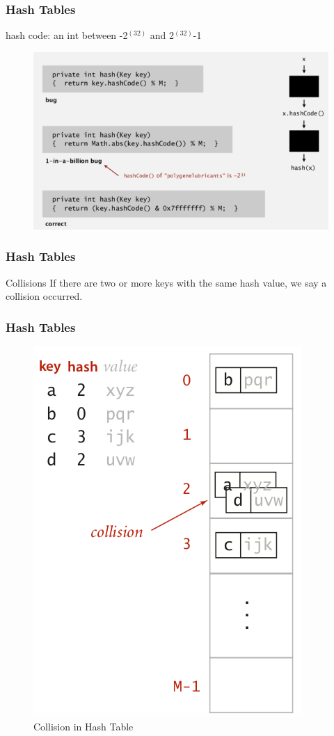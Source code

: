 \documentclass[11pt]{beamer}
\begin{document}
      \begin{frame}
     	\frametitle{Hash Tables}
     	\alert{hash code: } an int between -2$^(32)$ and 2$^(32)$-1
     	\begin{figure}
     		\centering
     		\includegraphics[width=1\linewidth]{"Screenshot 2020-11-29 at 10.40.20 PM"}
     		\label{fig:screenshot-2020-11-29-at-10}
     	\end{figure}
     	
     \end{frame}

     	\begin{frame}
     	\frametitle{Hash Tables}
     	\begin{block}{Collisions}
     		If there are two or more keys with the same hash value, we say a collision occurred.
     	\end{block}
       
     \end{frame}
       \begin{frame}
     	\frametitle{Hash Tables}	
     	\begin{figure}
     		\centering
     		\includegraphics[width=0.45\linewidth]{"Screenshot 2020-11-29 at 8.41.55 AM"}
     		\caption{Collision in Hash Table}
     		\label{fig:screenshot-2020-11-29-at-8}
     	\end{figure}   	
     \end{frame}
 
\end{document}

